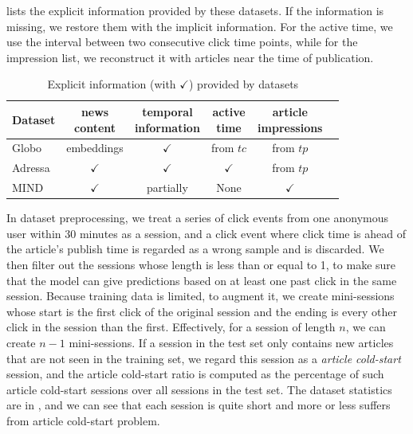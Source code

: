  lists the explicit information provided by these datasets. If the information is missing, we restore them with the implicit information. For the active time, we use the interval between two consecutive click time points, while for the impression list, we reconstruct it with articles near the time of publication.
\begin{table}[th]\setlength{\tabcolsep}{3pt}
  \caption{Explicit information (with $\checkmark$) provided by datasets}
  \label{tb:dataset_info}
  \centering
  \begin{tabular}{l|ccccc}
    \toprule
     Dataset & \tabincell{c}{news\\content} & \tabincell{c}{temporal\\information} & \tabincell{c}{active\\time}  & \tabincell{c}{article\\impressions}\\
    \midrule
    Globo   & embeddings   & $\checkmark$ & from $tc$  & from $tp$  \\
    Adressa & $\checkmark$ & $\checkmark$ & $\checkmark$ & from $tp$\\
    MIND    & $\checkmark$ & partially & None & $\checkmark$ \\
    \bottomrule
  \end{tabular}
\end{table}

In dataset preprocessing, we treat a series of click events from one anonymous user 
within 30 minutes as a session, and a click event where click time is ahead of the 
article's publish time is regarded as a wrong sample and is discarded. 
We then filter out the sessions whose length is less than or equal to 1, 
to make sure that the model can give predictions based on at least one past click in
the same session. 
Because training data is limited, to augment it, 
we create mini-sessions whose start is the first click of the original
session and the ending is every other click in the session than the first.
Effectively, for a session of length $n$, we can create $n-1$ mini-sessions.
If a session in the test set only contains new articles that are not seen 
in the training set, we regard this session as a \textit{article cold-start} session, 
and the article cold-start ratio is computed as the percentage of such article cold-start sessions
over all sessions in the test set. The dataset statistics are 
in , and we can see that each session is quite short and 
more or less suffers from article cold-start problem.

